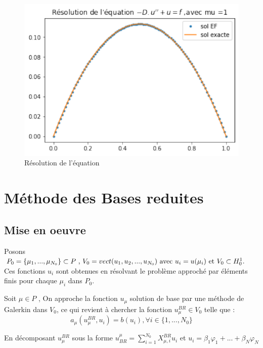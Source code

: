 \documentclass[12pt]{article}
\begin{document}
\begin{figure}
\begin{center}
\includegraphics[scale=1]{sol_ef_exa.pdf}
\caption[]{Résolution de l'équation }
\end{center}
\end{figure}





\newpage


\section{Méthode des Bases reduites}



\subsection {Mise en oeuvre}
Posons 
$P_{0} = \{\mu_1,...,\mu_{N_0} \} \subset P \text{ , } V_{0}= vect(u_1,u_2,...,u_{N_0}) \text{ avec } u_i = u(\mu_i) \text{ et } V_{0} \subset  H_{0}^{1}.   \\
$
Ces fonctions $u_i$ sont obtenues en résolvant le problème approché par éléments
finis pour chaque $ \mu_i$ dans $P_{0}$.

Soit $ \mu \in P$ ,  On approche la fonction $u_{\mu}$ 
solution de base par une méthode de Galerkin dans 
$V_{0}$, ce qui revient à chercher la fonction 
$u^{BR}_{\mu} \in V_0$ telle que : 
$$
a_{\mu}(u^{BR}_{\mu},u_i) = b(u_i) , \forall i \in \{1,...,N_0\}
$$

En décomposant $u^{BR}_{\mu}$ sous la forme 
$u_{BR}^{\mu} = \sum_{i = 1}^{N_0} X^{BR}_{\mu,i}u_i$
et $u_i = \beta_1 \varphi_1 + ...+ \beta_N \varphi_N $
\end{document}
